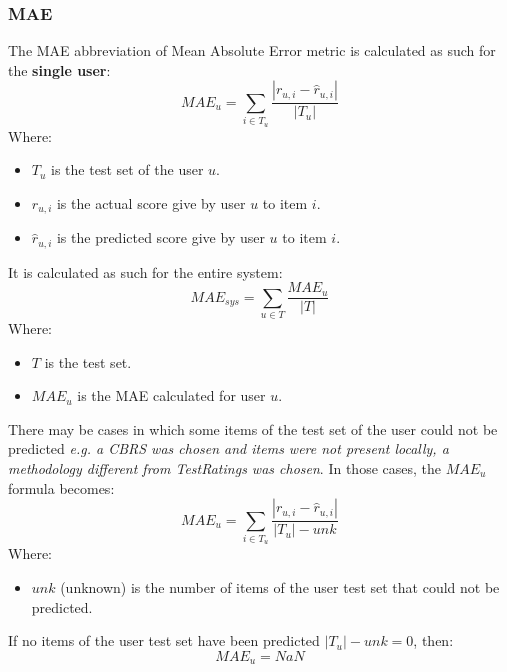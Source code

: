 \subsubsection{MAE}\label{subsubsec:mae}
The MAE abbreviation of Mean Absolute Error metric is calculated as such for the \textbf{single user}:
\hfill\break
\hfill\break
    \[
        MAE_u = \sum_{i \in T_u} \frac{|r_{u,i} - \hat{r}_{u,i}|}{|T_u|}
    \]
\hfill\break
\hfill\break
    Where:
\begin{itemize}
    \item $T_u$ is the test set of the user $u$.
    \item $r_{u, i}$ is the actual score give by user $u$ to item $i$.
    \item $\hat{r}_{u, i}$ is the predicted score give by user $u$ to item $i$.
\end{itemize}
\hfill\break
\hfill\break
It is calculated as such for the entire system:
\hfill\break
\hfill\break
    \[
        MAE_{sys} = \sum_{u \in T} \frac{MAE_u}{|T|}
    \]
\hfill\break
\hfill\break
    Where:
\begin{itemize}
    \item $T$ is the test set.
    \item $MAE_u$ is the MAE calculated for user $u$.
\end{itemize}
\hfill\break
\hfill\break
There may be cases in which some items of the test set of the user could not be predicted
\textit{e.g. a CBRS was chosen and items were not present locally, a methodology different from TestRatings was chosen}.
In those cases, the $MAE_u$ formula becomes:
\hfill\break
\hfill\break
    \[
        MAE_u = \sum_{i \in T_u} \frac{|r_{u,i} - \hat{r}_{u,i}|}{|T_u| - unk}
    \]
\hfill\break
\hfill\break
    Where:
\begin{itemize}
    \item $unk$ (unknown) is the number of items of the user test set that could not be predicted.
\end{itemize}
\hfill\break
\hfill\break
If no items of the user test set have been predicted $|T_u| - unk = 0$, then:
\hfill\break
\hfill\break
    \[
        MAE_u = NaN
    \]
\hfill\break
\hfill\break

